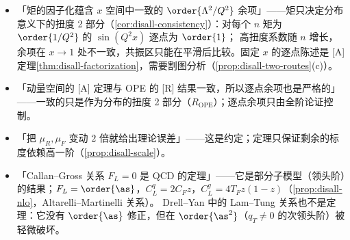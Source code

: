 \begin{tcolorbox}[enhanced,breakable,title=本章涉及的常见误解,fonttitle=\bfseries,
  colback=gray!3!white,colframe=gray!55!black,boxrule=0.6pt,arc=2pt,
  left=5pt,right=5pt,top=3pt,bottom=3pt,before skip=6pt,after skip=6pt]
\begin{itemize}[leftmargin=1.2em,itemsep=1pt,topsep=1pt]
\item 「矩的因子化蕴含 $x$ 空间中一致的 $\order{\Lambda^2/Q^2}$ 余项」——矩只决定分布意义下的扭度 2 部分（\cref{cor:disall-consistency}）：对每个 $n$ 矩为 $\order{1/Q^2}$ 的 $\sin(Q^2x)$ 逐点为 $\order{1}$；
高扭度系数随 $n$ 增长，余项在 $x\to1$ 处不一致，共振区只能在平滑后比较。固定 $x$ 的逐点陈述是 [A] 定理\cref{thm:disall-factorization}，需要割图分析（\cref{prop:disall-two-routes}(c)）。
\item 「动量空间的 [A] 定理与 OPE 的 [R] 结果一致，所以逐点余项也是严格的」——一致的只是作为分布的扭度 2 部分（$R_{\mathrm{OPE}}$）；逐点余项只由全阶论证控制。
\item 「把 $\mu_R,\mu_F$ 变动 $2$ 倍就给出理论误差」——这是约定；定理只保证剩余的标度依赖高一阶（\cref{prop:disall-scale}）。
\item 「Callan--Gross 关系 $F_L=0$ 是 QCD 的定理」——它是部分子模型（领头阶）的结果；$F_L=\order{\as}$，$C_L^q=2C_Fz$，$C_L^g=4T_Fz(1-z)$（\cref{prop:disall-nlo}，Altarelli--Martinelli 关系）。
Drell--Yan 中的 Lam--Tung 关系也不是定理：它没有 $\order{\as}$ 修正\cite{Lam:1980uc}，但在 $\order{\as^2}$（$q_T\ne0$ 的次领头阶）被轻微破坏\cite{Mirkes:1992hu}。
\end{itemize}
\end{tcolorbox}


